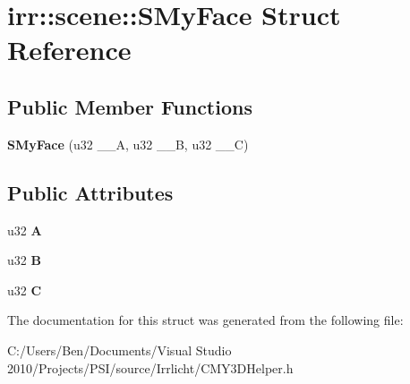 \hypertarget{structirr_1_1scene_1_1_s_my_face}{\section{irr\-:\-:scene\-:\-:S\-My\-Face Struct Reference}
\label{structirr_1_1scene_1_1_s_my_face}
}
\subsection*{Public Member Functions}
\begin{DoxyCompactItemize}
\item 
\hypertarget{structirr_1_1scene_1_1_s_my_face_a492ff4d36b39abffc1bb9449cfd87972}{{\bfseries S\-My\-Face} (u32 \-\_\-\-\_\-\-A, u32 \-\_\-\-\_\-\-B, u32 \-\_\-\-\_\-\-C)}\label{structirr_1_1scene_1_1_s_my_face_a492ff4d36b39abffc1bb9449cfd87972}

\end{DoxyCompactItemize}
\subsection*{Public Attributes}
\begin{DoxyCompactItemize}
\item 
\hypertarget{structirr_1_1scene_1_1_s_my_face_ace4e6a699cc4ee46d7f86bb9909926cf}{u32 {\bfseries A}}\label{structirr_1_1scene_1_1_s_my_face_ace4e6a699cc4ee46d7f86bb9909926cf}

\item 
\hypertarget{structirr_1_1scene_1_1_s_my_face_a10b20d0f07a8fa9ded6c897810a09478}{u32 {\bfseries B}}\label{structirr_1_1scene_1_1_s_my_face_a10b20d0f07a8fa9ded6c897810a09478}

\item 
\hypertarget{structirr_1_1scene_1_1_s_my_face_ae92e9c50d6118021d4de20866f81cdd5}{u32 {\bfseries C}}\label{structirr_1_1scene_1_1_s_my_face_ae92e9c50d6118021d4de20866f81cdd5}

\end{DoxyCompactItemize}


The documentation for this struct was generated from the following file\-:\begin{DoxyCompactItemize}
\item 
C\-:/\-Users/\-Ben/\-Documents/\-Visual Studio 2010/\-Projects/\-P\-S\-I/source/\-Irrlicht/C\-M\-Y3\-D\-Helper.\-h\end{DoxyCompactItemize}
